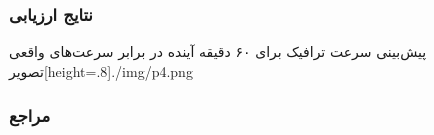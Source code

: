 \documentclass{beamer}
\begin{document}
\begin{frame}
  \frametitle{نتایج ارزیابی}
  پیش‌بینی سرعت ترافیک برای ۶۰ دقیقه آینده در برابر سرعت‌های واقعی
  ‌تصویر[height=.8\textheight]{./img/p4.png}
\end{frame}

\begin{frame}[allowframebreaks]
  \frametitle{مراجع}
  \nocite{*}
  \begin{latin}
  \printbibliography[title=مراجع]
  \end{latin}
\end{frame}
\end{document}
